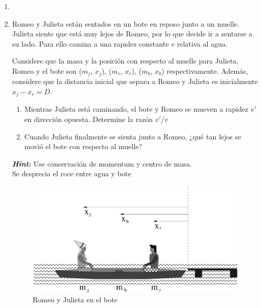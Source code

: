 \documentclass[letterpaper,11pt]{article}
\begin{document}
\vspace{-1cm}
\begin{enumerate}\setlength{\itemsep}{0.4cm}


\item[]

\item Romeo y Julieta están sentados en un bote en reposo junto a un muelle. Julieta siente que está muy lejos de Romeo, por lo que decide ir a sentarse a su lado. Para ello camina a una rapidez constante $v$ relativa al agua.

Considere que la masa y la posición con respecto al muelle para Julieta, Romeo y el bote son ($m_j$, $x_j$), ($m_r$, $x_r$), ($m_b$, $x_b$) respectivamente. Además, considere que la distancia inicial que separa a Romeo y Julieta es inicialmente $x_j-x_r=D$.

    \begin{enumerate}
        \item Mientras Julieta está caminando, el bote y Romeo se mueven a rapidez $v'$ en dirección opuesta. Determine la razón $v'/v$
        
        \item Cuando Julieta finalmente se sienta junto a Romeo, ¿qué tan lejos se movió el bote con respecto al muelle?
    \end{enumerate}
    
\textbf{\textit{Hint:}} Use conservación de momentum y centro de masa.\\
Se desprecia el roce entre agua y bote

\begin{figure}[H]
    \centering
    \includegraphics[width=0.6\linewidth]{2021-1/Imagenes/ejercicios/romeo-julieta.PNG}
    \caption{Romeo y Julieta en el bote}
\end{figure}

\end{enumerate}
\end{document}
